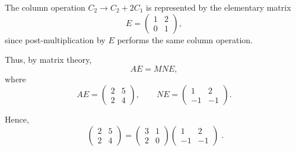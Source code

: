 \documentclass[journal]{IEEEtran}
\begin{document}
The column operation $C_2 \to C_2+2C_1$ is represented by the elementary matrix
\[
E=\begin{pmatrix}1&2\\0&1\end{pmatrix},
\]
since post-multiplication by $E$ performs the same column operation.

Thus, by matrix theory,
\[
AE = MNE,
\]
where
\[
AE=\begin{pmatrix}2&5\\2&4\end{pmatrix}, \qquad
NE=\begin{pmatrix}1&2\\-1&-1\end{pmatrix}.
\]

Hence,
\[
\boxed{\;
\begin{pmatrix}2&5\\2&4\end{pmatrix}
=
\begin{pmatrix}3&1\\2&0\end{pmatrix}
\begin{pmatrix}1&2\\-1&-1\end{pmatrix}
\;}.
\]
\end{document}
